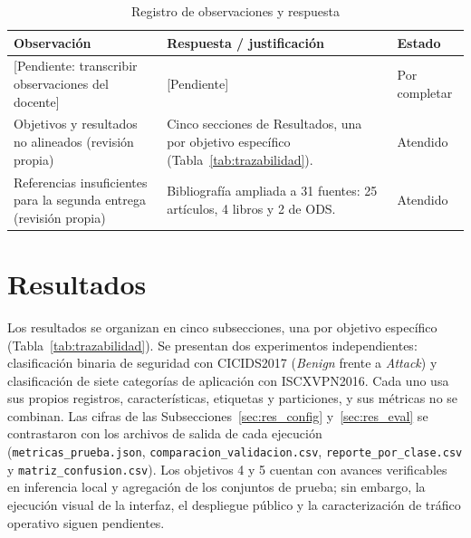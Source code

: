 \documentclass[conference]{IEEEtran}
\begin{document}
\begin{table}[!tb]
\centering
\footnotesize
\caption{Registro de observaciones y respuesta}
\label{tab:feedback}
\begin{tabular}{p{2.3cm}p{3.7cm}p{1.2cm}}
\toprule
\textbf{Observación} & \textbf{Respuesta / justificación} & \textbf{Estado} \\
\midrule
{[Pendiente: transcribir observaciones del docente]} & {[Pendiente]} & Por completar \\
Objetivos y resultados no alineados (revisión propia) & Cinco secciones de Resultados, una por objetivo específico (Tabla~\ref{tab:trazabilidad}). & Atendido \\
Referencias insuficientes para la segunda entrega (revisión propia) & Bibliografía ampliada a 31 fuentes: 25 artículos, 4 libros y 2 de ODS. & Atendido \\
\bottomrule
\end{tabular}
\end{table}

\section{Resultados}
\label{sec:resultados}

Los resultados se organizan en cinco subsecciones, una por objetivo específico (Tabla~\ref{tab:trazabilidad}). Se presentan dos experimentos independientes: clasificación binaria de seguridad con CICIDS2017 (\textit{Benign} frente a \textit{Attack}) y clasificación de siete categorías de aplicación con ISCXVPN2016. Cada uno usa sus propios registros, características, etiquetas y particiones, y sus métricas no se combinan. Las cifras de las Subsecciones~\ref{sec:res_config} y~\ref{sec:res_eval} se contrastaron con los archivos de salida de cada ejecución (\texttt{metricas\_prueba.json}, \texttt{comparacion\_validacion.csv}, \texttt{reporte\_por\_clase.csv} y \texttt{matriz\_confusion.csv}). Los objetivos 4 y 5 cuentan con avances verificables en inferencia local y agregación de los conjuntos de prueba; sin embargo, la ejecución visual de la interfaz, el despliegue público y la caracterización de tráfico operativo siguen pendientes.
\end{document}
